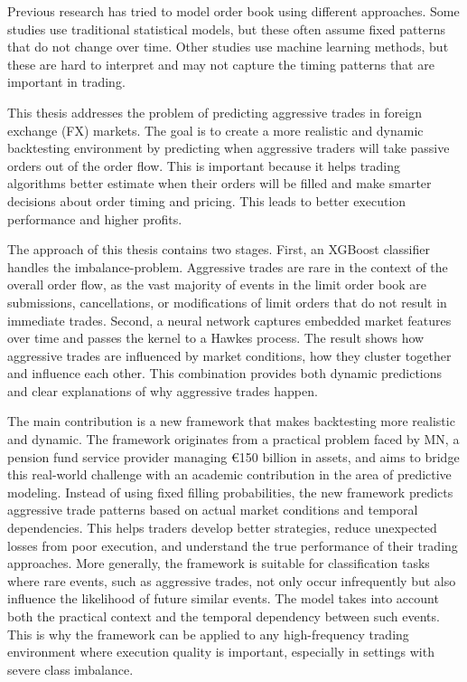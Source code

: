Previous research has tried to model order book using different approaches. Some studies use traditional statistical models, but these often assume fixed patterns that do not change over time. Other studies use machine learning methods, but these are hard to interpret and may not capture the timing patterns that are important in trading. 

This thesis addresses the problem of predicting aggressive trades in foreign exchange (FX) markets. The goal is to create a more realistic and dynamic backtesting environment by predicting when aggressive traders will take passive orders out of the order flow. This is important because it helps trading algorithms better estimate when their orders will be filled and make smarter decisions about order timing and pricing. This leads to better execution performance and higher profits.

The approach of this thesis contains two stages. First, an XGBoost classifier handles the imbalance-problem. Aggressive trades are rare in the context of the overall order flow, as the vast majority of events in the limit order book are submissions, cancellations, or modifications of limit orders that do not result in immediate trades. Second, a neural network captures embedded market features over time and passes the kernel to a Hawkes process. The result shows how aggressive trades are influenced by market conditions, how they cluster together and influence each other. This combination provides both dynamic predictions and clear explanations of why aggressive trades happen.

The main contribution is a new framework that makes backtesting more realistic and dynamic. The framework originates from a practical problem faced by MN, a pension fund service provider managing €150 billion in assets, and aims to bridge this real-world challenge with an academic contribution in the area of predictive modeling. Instead of using fixed filling probabilities, the new framework predicts aggressive trade patterns based on actual market conditions and temporal dependencies. This helps traders develop better strategies, reduce unexpected losses from poor execution, and understand the true performance of their trading approaches. More generally, the framework is suitable for classification tasks where rare events, such as aggressive trades, not only occur infrequently but also influence the likelihood of future similar events. The model takes into account both the practical context and the temporal dependency between such events. This is why the framework can be applied to any high-frequency trading environment where execution quality is important, especially in settings with severe class imbalance. 

